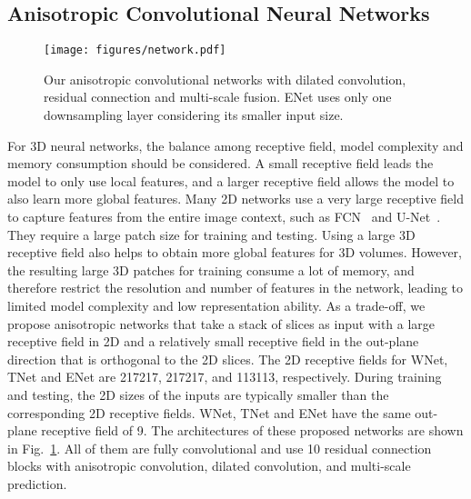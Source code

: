 \documentclass[a4paper,orivec,runningheads]{llncs}
\begin{document}
\subsection{Anisotropic Convolutional Neural Networks}
\begin{figure}[t]
	\centering
	\texttt{[image: figures/network.pdf]}
	\caption[anisotropic network]{
		Our anisotropic convolutional networks with dilated convolution, residual connection and multi-scale fusion. ENet uses only one downsampling layer considering its smaller input size.
	}
	\label{fig:network}
\end{figure}
For 3D neural networks, the balance among receptive field, model complexity and memory consumption should be considered. A small receptive field leads the model to only use local features, and a larger receptive field allows the model to also learn more global features. Many 2D networks use a very large receptive field to capture features from the entire image context, such as FCN~\cite{Long2014} and U-Net~\cite{Hefny2015a}. They require a large patch size for training and testing. Using a large 3D receptive field also helps to obtain more global features for 3D volumes. However, the resulting large 3D patches for training consume a lot of memory, and therefore restrict the resolution and number of features in the network, leading to limited model complexity and low representation ability. As a trade-off, we propose anisotropic networks that take a stack of slices as input with a large receptive field in 2D and a relatively small receptive field in the out-plane direction that is orthogonal to the 2D slices. The 2D receptive fields for WNet, TNet and ENet are 217217, 217217, and 113113, respectively. During training and testing, the 2D sizes of the inputs are typically smaller than the corresponding 2D receptive fields. WNet, TNet and ENet have the same out-plane receptive field of 9. The architectures of these proposed networks are shown in Fig.~\ref{fig:network}. All of them are fully convolutional and use 10 residual connection blocks with anisotropic convolution, dilated convolution, and multi-scale prediction.
\end{document}
